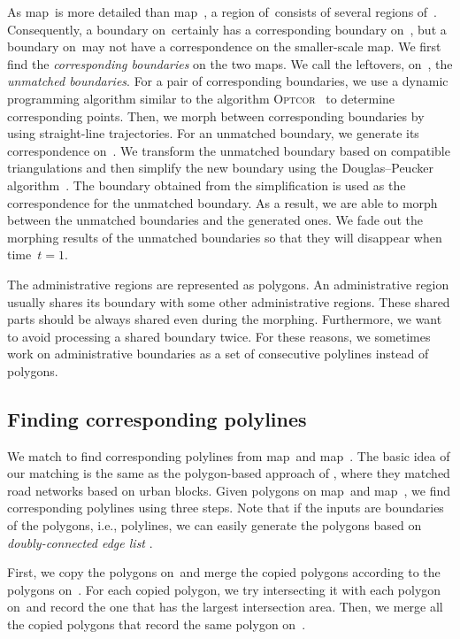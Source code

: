 As map~\ml is more detailed than map~\ms, 
a region of~\ms consists of several regions of~\ml. 
Consequently, a boundary on~\ms certainly 
has a corresponding boundary on~\ml, 
but a boundary on~\ml may not
have a correspondence on the smaller-scale map. 
We first find the \emph{corresponding boundaries} on the two maps.
We call the leftovers, on~\ml, the \emph{unmatched boundaries}. 
For a pair of corresponding boundaries, we
use a dynamic programming algorithm similar to the algorithm 
\textsc{Optcor}~\parencite{Noellenburg2008} to determine 
corresponding points.
Then, we morph between corresponding boundaries 
by using straight-line trajectories. 
For an unmatched boundary, we generate its correspondence on~\ms.
We transform the unmatched boundary based on compatible triangulations 
and then simplify the new boundary using the 
Douglas--Peucker algorithm~\parencite{Douglas1973}.
The boundary obtained from the simplification is used as 
the correspondence for the unmatched boundary.
As a result, we are able to morph 
between the unmatched boundaries and the generated ones. 
We fade out the morphing results of the unmatched boundaries
so that they will disappear when time~$t=1$.

The administrative regions are represented as polygons. 
An administrative region usually shares its boundary 
with some other administrative regions. 
These shared parts should be 
always shared even during the morphing.
Furthermore, we want to avoid processing a shared boundary twice.
For these reasons, we sometimes work on administrative boundaries
as a set of consecutive polylines instead of polygons.



\subsection{Finding corresponding polylines}
\label{sec:Admin_Preprocessing}

We match to find corresponding polylines 
from map~\ml and map~\ms.
The basic idea of our matching is the same as the polygon-based 
approach of \textcite{Fan2016Matching}, where they matched road 
networks based on urban blocks.
Given polygons on map~\ml and map~\ms, 
we find corresponding polylines using three steps. 
Note that if the inputs are boundaries of the polygons, 
i.e., polylines, 
we can easily generate the polygons 
based on \emph{doubly-connected edge list} 
\parencite[]{deBerg2008}.

First, we copy the polygons on~\ml and 
merge the copied polygons according to the polygons on~\ms. 
For each copied polygon, 
we try intersecting it with each polygon on~\ms and 
record the one that has the largest intersection area. 
Then, we merge all the copied 
polygons that record the same polygon on~\ms.

